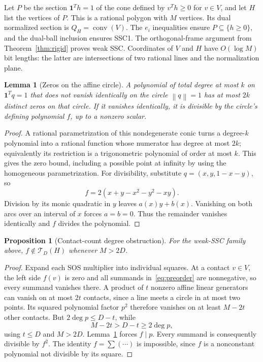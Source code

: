 \documentclass[11pt]{article}
\newtheorem{lemma}[theorem]{Lemma}
\newtheorem{proposition}[theorem]{Proposition}
\theoremstyle{definition}\newtheorem{definition}[theorem]{Definition}
\newcommand{\e}{\mathbf1}\newcommand{\cone}{\operatorname{cone}}
\newcommand{\conv}{\operatorname{conv}}\newcommand{\diag}{\operatorname{diag}}
\newcommand{\norm}[1]{\left\lVert#1\right\rVert}\newcommand{\Tr}{\mathcal T}
\begin{document}
Let $P$ be the section $\e^Th=1$ of the cone defined by $v^Th\ge0$ for $v\in V$, and let $H$ list the vertices of $P$. This is a rational polygon with $M$ vertices. Its dual normalized section is $Q_H=\conv(V)$. The $e_i$ inequalities ensure $P\subseteq\{h\ge0\}$, and the dual-ball inclusion ensures SSC1. The orthogonal-frame argument from Theorem~\ref{thm:rigid} proves weak SSC. Coordinates of $V$ and $H$ have $O(\log M)$ bit lengths: the latter are intersections of two rational lines and the normalization plane.

\begin{lemma}[Zeros on the affine circle]
\label{lem:circlezeros}
A polynomial of total degree at most $k$ on $\e^Tq=1$ that does not vanish identically on the circle $\norm{q}=1$ has at most $2k$ distinct zeros on that circle. If it vanishes identically, it is divisible by the circle's defining polynomial $f$, up to a nonzero scalar.
\end{lemma}
\begin{proof}
A rational parametrization of this nondegenerate conic turns a degree-$k$ polynomial into a rational function whose numerator has degree at most $2k$; equivalently its restriction is a trigonometric polynomial of order at most $k$. This gives the zero bound, including a possible point at infinity by using the homogeneous parametrization. For divisibility, substitute $q=(x,y,1-x-y)$, so
\begin{equation}
 f=2(x+y-x^2-y^2-xy).
 \label{eq:circlepoly}
\end{equation}
Division by its monic quadratic in $y$ leaves $a(x)y+b(x)$. Vanishing on both arcs over an interval of $x$ forces $a=b=0$. Thus the remainder vanishes identically and $f$ divides the polynomial.
\end{proof}

\begin{proposition}[Contact-count degree obstruction]
\label{prop:weakdegree}
For the weak-SSC family above, $f\notin\Tr_D(H)$ whenever $M>2D$.
\end{proposition}
\begin{proof}
Expand each SOS multiplier into individual squares. At a contact $v\in V$, the left side $f(v)$ is zero and all summands in~\eqref{eq:preorder} are nonnegative, so every summand vanishes there. A product of $t$ nonzero affine linear generators can vanish on at most $2t$ contacts, since a line meets a circle in at most two points. Its squared polynomial factor $p^2$ therefore vanishes on at least $M-2t$ other contacts. But $2\deg p\le D-t$, while
\[
 M-2t>D-t\ge2\deg p,
\]
using $t\le D$ and $M>2D$. Lemma~\ref{lem:circlezeros} forces $f\mid p$. Every summand is consequently divisible by $f^2$. The identity $f=\sum(\cdots)$ is impossible, since $f$ is a nonconstant polynomial not divisible by its square.
\end{proof}
\end{document}
